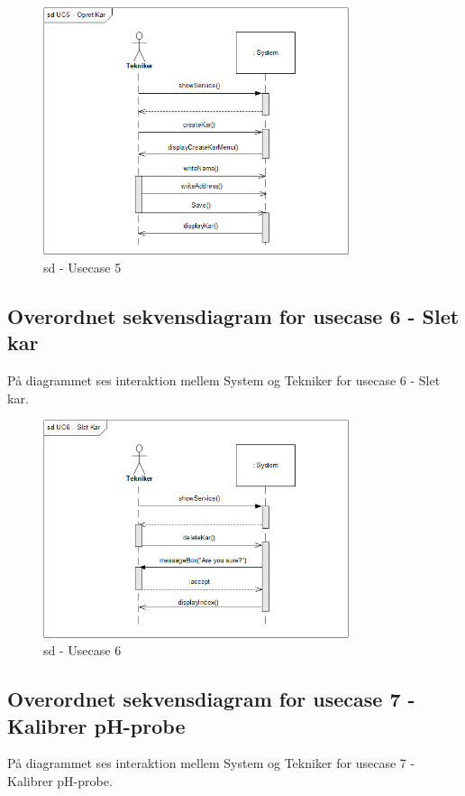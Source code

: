 \begin{figure}[H]
    \centering
    \includegraphics[width=0.8\textwidth]{Systemarkitektur/OverordnedeSekvensdiagrammer/sd_UC5.PNG}
    \caption{sd - Usecase 5}
    \label{fig:sd_UC5}
\end{figure}

\subsection{Overordnet sekvensdiagram for usecase 6 - Slet kar}
På diagrammet ses interaktion mellem System og Tekniker for usecase 6 - Slet kar.

\begin{figure}[H]
    \centering
    \includegraphics[width=0.8\textwidth]{Systemarkitektur/OverordnedeSekvensdiagrammer/sd_UC6.PNG}
    \caption{sd - Usecase 6}
    \label{fig:sd_UC6}
\end{figure}

\subsection{Overordnet sekvensdiagram for usecase 7 - Kalibrer pH-probe}
På diagrammet ses interaktion mellem System og Tekniker for usecase 7 - Kalibrer pH-probe.

